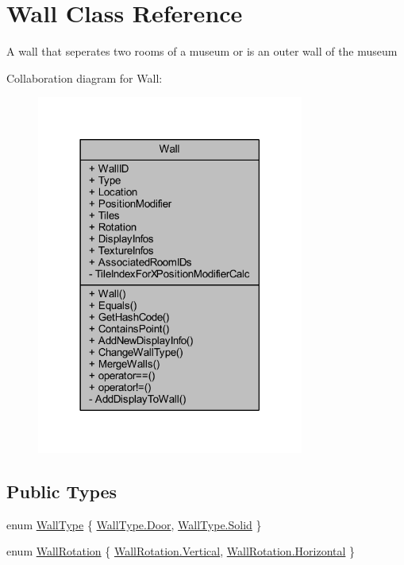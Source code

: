 \hypertarget{class_wall}{}\section{Wall Class Reference}
\label{class_wall}


A wall that seperates two rooms of a museum or is an outer wall of the museum  




Collaboration diagram for Wall\+:\nopagebreak
\begin{figure}[H]
\begin{center}
\leavevmode
\includegraphics[width=249pt]{class_wall__coll__graph}
\end{center}
\end{figure}
\subsection*{Public Types}
\begin{DoxyCompactItemize}
\item 
enum \mbox{\hyperlink{class_wall_a1366d94ac70428624a6703d7db89638d}{Wall\+Type}} \{ \mbox{\hyperlink{class_wall_a1366d94ac70428624a6703d7db89638daf44e14d49cd011d1e873d9fe0c4624f1}{Wall\+Type.\+Door}}, 
\mbox{\hyperlink{class_wall_a1366d94ac70428624a6703d7db89638dae41480b6bbfbf7407974a88d3d34f4fa}{Wall\+Type.\+Solid}}
 \}
\item 
enum \mbox{\hyperlink{class_wall_a0ff16a0e73bfc8f0d89c5fd6849e3a97}{Wall\+Rotation}} \{ \mbox{\hyperlink{class_wall_a0ff16a0e73bfc8f0d89c5fd6849e3a97a06ce2a25e5d12c166a36f654dbea6012}{Wall\+Rotation.\+Vertical}}, 
\mbox{\hyperlink{class_wall_a0ff16a0e73bfc8f0d89c5fd6849e3a97ac1b5fa03ecdb95d4a45dd1c40b02527f}{Wall\+Rotation.\+Horizontal}}
 \}
\end{DoxyCompactItemize}
